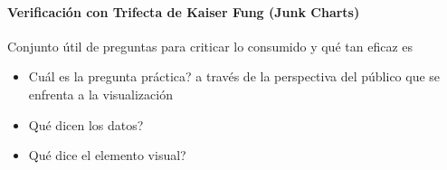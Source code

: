 \paragraph{Verificación con Trifecta de Kaiser Fung (Junk Charts)}
Conjunto útil de preguntas para criticar lo consumido y qué tan eficaz es
\begin{itemize}
    \item {Cuál es la pregunta práctica? a través de la perspectiva del público que se enfrenta a la visualización}
    \item {Qué dicen los datos?}
    \item {Qué dice el elemento visual?}
\end{itemize}
